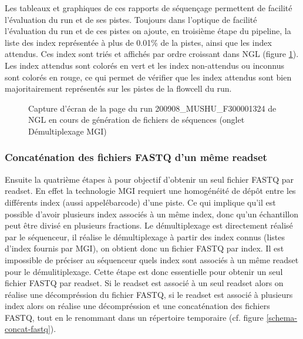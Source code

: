 Les tableaux et graphiques de ces rapports de séquençage permettent de facilité l'évaluation du run et de ses pistes.
Toujours dans l'optique de facilité l'évaluation du run et de ces pistes on ajoute, en troisième étape du pipeline, la liste des index représentée à plus de 0.01\% de la pistes, ainsi que les index attendus.
Ces index sont triés et affichés par ordre croissant dans NGL (figure \ref{top-index}).
Les index attendus sont colorés en vert et les index non-attendus ou inconnus sont colorés en rouge, ce qui permet de vérifier que les index attendus sont bien majoritairement représentés sur les pistes de la flowcell du run.

\begin{figure}[H]
    \centering
    \caption{\footnotesize{Capture d'écran de la page du run 200908\_MUSHU\_F300001324 de NGL en cours de génération de fichiers de séquences (onglet \og Démultiplexage MGI\fg{})}}
    \label{top-index}
\end{figure}

\subsubsection{Concaténation des fichiers FASTQ d'un même readset}
Ensuite la quatrième étapes à pour objectif d'obtenir un seul fichier FASTQ par readset.
En effet la technologie MGI requiert une homogénéité de dépôt entre les différents index (aussi appelé\og barcode\fg{}) d'une piste.
Ce qui implique qu'il est possible d'avoir plusieurs index associés à un même index, donc qu'un échantillon peut être divisé en plusieurs fractions.
Le démultiplexage est directement réalisé par le séquenceur, il réalise le démultiplexage à partir des index connus (listes d'index fournis par MGI), on obtient donc un fichier FASTQ par index. Il est impossible de préciser au séquenceur quels index sont associés à un même readset pour le démulitiplexage.
Cette étape est donc essentielle pour obtenir un seul fichier FASTQ par readset.
Si le readset est associé à un seul readset alors on réalise une décompréssion du fichier FASTQ, si le readset est associé à plusieurs index alors on réalise une décompréssion et une concaténation des fichiers FASTQ, tout en le renommant dans un répertoire temporaire (cf. figure \ref{schema-concat-fastq}).


